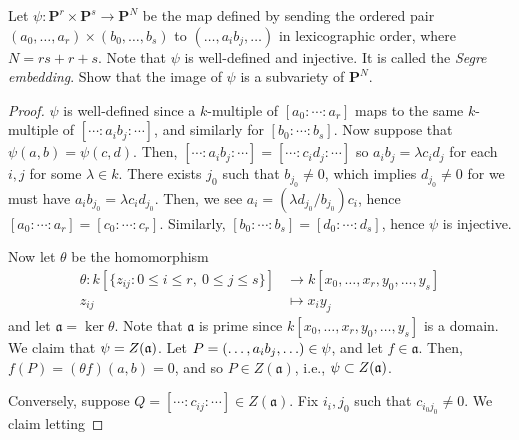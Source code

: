 \documentclass[10pt]{article}
\theoremstyle{definition}
\theoremstyle{remark}
\numberwithin{equation}{section}
\numberwithin{figure}{subsubsection}
\let\Im\relax
\DeclareMathOperator{\Im}{im}
\newcommand{\PP}{\mathbf{P}}
\begin{document}
\begin{problem}\label{exc:I.2.14}
  Let $\psi\colon \PP^r \times \PP^s \to \PP^N$ be the map defined by sending
  the ordered pair $(a_0, \ldots, a_r) \times (b_0, \ldots, b_s)$ to $(\ldots,
  a_ib_j, \ldots)$ in lexicographic order, where $N = rs + r +s$. Note that
  $\psi$ is well-defined and injective. It is called the \emph{Segre embedding}.
  Show that the image of $\psi$ is a subvariety of $\PP^N$.
\end{problem}
\begin{proof}
  $\psi$ is well-defined since a $k$-multiple of $[a_0:\cdots:a_r]$ maps to the
  same $k$-multiple of $[\cdots:a_ib_j:\cdots]$, and similarly for
  $[b_0:\cdots:b_s]$. Now suppose that $\psi(a,b) = \psi(c,d)$. Then,
  $[\cdots:a_ib_j:\cdots] = [\cdots:c_id_j:\cdots]$ so $a_ib_j = \lambda c_id_j$
  for each $i,j$ for some $\lambda \in k$. There exists $j_0$ such that
  $b_{j_0} \ne 0$, which implies $d_{j_0} \ne 0$ for we must have
  $a_ib_{j_0} = \lambda c_id_{j_0}$. Then, we see $a_i = (\lambda
  d_{j_0}/b_{j_0}) c_i$, hence $[a_0:\cdots:a_r] = [c_0:\cdots:c_r]$. Similarly,
  $[b_0:\cdots:b_s] = [d_0:\cdots:d_s]$, hence $\psi$ is injective.
  \par Now let $\theta$ be the homomorphism
  \begin{align*}
    \theta\colon k[\{z_{ij} : 0\le i \le r,\ 0 \le j \le s\}] &\to
    k[x_0, \ldots, x_r, y_0, \ldots, y_s]\\
    z_{ij} &\mapsto x_iy_j
  \end{align*}
  and let $\mathfrak{a} = \ker\theta$. Note that $\mathfrak{a}$ is prime since
  $k[x_0, \ldots, x_r, y_0, \ldots, y_s]$ is a domain.
  We claim that $\Im \psi = Z(\mathfrak{a})$. Let $P = (\ldots, a_ib_j,\ldots)
  \in \Im \psi$, and let $f \in \mathfrak{a}$. Then, $f(P) = (\theta f)(a,b) =
  0$, and so $P \in Z(\mathfrak{a})$, i.e., $\Im \psi \subset Z(\mathfrak{a})$.
  \par Conversely, suppose $Q = [\cdots:c_{ij}:\cdots] \in Z(\mathfrak{a})$.
  Fix $i_i,j_0$ such that $c_{i_0j_0} \ne 0$. We claim letting

\end{proof}
\end{document}
